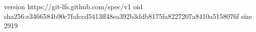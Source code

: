 version https://git-lfs.github.com/spec/v1
oid sha256:e3466584b90c7fafccd5413ff48ea392b3ddb8175fa8227207a8410a5158076f
size 2919

